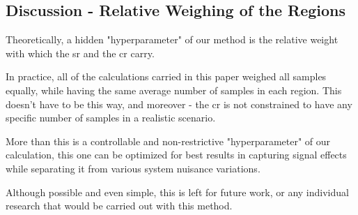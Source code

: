 \documentclass[thesis/Elad_Kliger_Thesis.tex]{subfiles}
\begin{document}
\subsection{Discussion - Relative Weighing of the Regions}
\label{disc:region_relative_weight}

Theoretically, a hidden "hyperparameter" of our method is the relative weight with which the \gls{sr} and the \gls{cr} carry.

In practice, all of the calculations carried in this paper weighed all samples equally, while having the same average number of samples in each region. This doesn't have to be this way, and moreover - the \gls{cr} is not constrained to have any specific number of samples in a realistic scenario.

More than this is a controllable and non-restrictive "hyperparameter" of our calculation, this one can be optimized for best results in capturing signal effects while separating it from various system nuisance variations.

Although possible and even simple, this is left for future work, or any individual research that would be carried out with this method.
\end{document}
